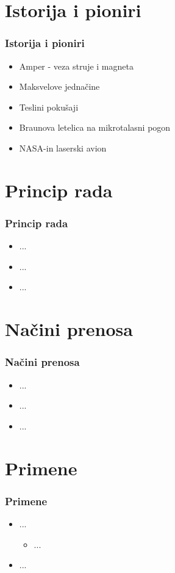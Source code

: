 \documentclass[11pt]{beamer}
\begin{document}
\section{Istorija i pioniri}

\begin{frame}\frametitle{Istorija i pioniri}
	\begin{itemize}	
		\item Amper - veza struje i magneta
		\item Maksvelove jednačine
		\item Teslini pokušaji
		\item Braunova letelica na mikrotalasni pogon
		\item NASA-in laserski avion
	\end{itemize}
\end{frame}

\section{Princip rada}

\begin{frame}\frametitle{Princip rada}
	\begin{itemize}	
		\item ...
		\item ...
		\item ...
	\end{itemize}
\end{frame}

\section{Načini prenosa}

\begin{frame}\frametitle{Načini prenosa}
	\begin{itemize}	
		\item ...
		\item ...
		\item ...
	\end{itemize}
\end{frame}

\section{Primene}

\begin{frame}\frametitle{Primene}
	\begin{itemize}	
		\item ...
		\begin{itemize}
	    \item ...
		\end{itemize}
		\item ...
	\end{itemize}
\end{frame}
\end{document}
